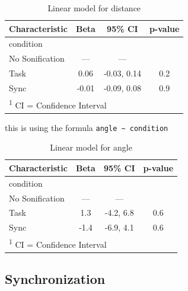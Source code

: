 \documentclass[10pt,a4paper,onecolumn]{article}
\begin{document}
\begin{table}

\caption{\label{tab:lm-dist}Linear model for distance}
\centering
\fontsize{7}{9}\selectfont
\begin{tabular}[t]{lccc}
\toprule
\textbf{Characteristic} & \textbf{Beta} & \textbf{95\% CI} & \textbf{p-value}\\
\midrule
condition &  &  & \\
\hspace{1em}No Sonification & — & — & \\
\hspace{1em}Task & 0.06 & -0.03, 0.14 & 0.2\\
\hspace{1em}Sync & -0.01 & -0.09, 0.08 & 0.9\\
\bottomrule
\multicolumn{4}{l}{\rule{0pt}{1em}\textsuperscript{1} CI = Confidence Interval}\\
\end{tabular}
\end{table}

this is using the formula \texttt{angle\ \textasciitilde{}\ condition}

\begin{table}

\caption{\label{tab:lm-ang}Linear model for angle}
\centering
\fontsize{7}{9}\selectfont
\begin{tabular}[t]{lccc}
\toprule
\textbf{Characteristic} & \textbf{Beta} & \textbf{95\% CI} & \textbf{p-value}\\
\midrule
condition &  &  & \\
\hspace{1em}No Sonification & — & — & \\
\hspace{1em}Task & 1.3 & -4.2, 6.8 & 0.6\\
\hspace{1em}Sync & -1.4 & -6.9, 4.1 & 0.6\\
\bottomrule
\multicolumn{4}{l}{\rule{0pt}{1em}\textsuperscript{1} CI = Confidence Interval}\\
\end{tabular}
\end{table}

\hypertarget{synchronization}{%
\subsection{Synchronization}\label{synchronization}}
\end{document}
